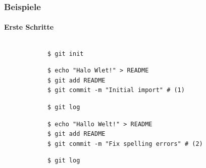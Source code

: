 \documentclass[]{beamer}
\begin{document}
\begin{frame}[fragile]
	\frametitle{Beispiele}
	\framesubtitle{Erste Schritte}
	\begin{columns}[T]
		\begin{column}{7.5cm}
			\begin{verbatim}
			$ git init
			\end{verbatim}

			\begin{verbatim}
			$ echo "Halo Wlet!" > README
			$ git add README
			$ git commit -m "Initial import" # (1)
			\end{verbatim}

			\begin{verbatim}
			$ git log
			\end{verbatim}

			\begin{verbatim}
			$ echo "Hallo Welt!" > README
			$ git add README
			$ git commit -m "Fix spelling errors" # (2)
			\end{verbatim}

			\begin{verbatim}
			$ git log
			\end{verbatim}
		\end{column}
		\begin{column}{2.5cm}
		\end{column}
	\end{columns}
\end{frame}
\end{document}
